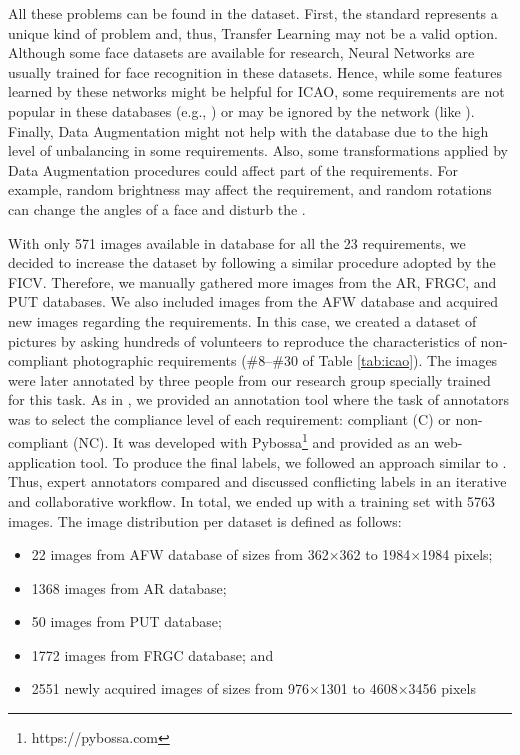 All these problems can be found in the \ficvtest dataset. First, the \icao standard represents a unique kind of problem and, thus, Transfer Learning may not be a valid option. Although some face datasets are available for research, Neural Networks are usually trained for face recognition in these datasets. Hence, while some features learned by these networks might be helpful for ICAO, some requirements are not popular in these databases (e.g., \inkmarked) or may be ignored by the network (like \variedbackground). Finally, Data Augmentation might not help with the \ficvtest database due to the high level of unbalancing in some requirements. Also, some transformations applied by Data Augmentation procedures could affect part of the requirements. For example, random brightness may affect the  \toodarklight requirement, and random rotations can change the angles of a face and disturb the \rollpitchyaw.
 
With only 571 images available in \ficvtest database for all the 23 requirements, we decided to increase the dataset by following a similar procedure adopted by the FICV. Therefore, we manually gathered more images from the AR, FRGC, and PUT databases. We also included images from the AFW database \citep{databaseAFW} and acquired new images regarding the \icao requirements. In this case, we created a dataset of pictures by asking hundreds of volunteers to reproduce the characteristics of non-compliant photographic requirements (\#8--\#30 of Table \ref{tab:icao}). The images were later annotated by three people from our research group specially trained for this task. As in \citep{Nowak2010}, we provided an annotation tool where the task of annotators was to select the compliance level of each requirement: compliant (C) or non-compliant (NC). It was developed with Pybossa\footnote{https://pybossa.com} and provided as an web-application tool. To produce the final labels, we followed an approach similar to \citep{Chang2017}. Thus, expert annotators compared and discussed conflicting labels in an iterative and collaborative workflow. In total, we ended up with a training set with 5763 images. The image distribution per dataset is defined as follows:

\begin{itemize}
\item 22 images from AFW database of sizes from 362$\times$362 to 1984$\times$1984 pixels;
\item 1368 images from AR database;
\item 50 images from PUT database;
\item 1772 images from FRGC database; and
\item 2551 newly acquired images of sizes from 976$\times$1301 to 4608$\times$3456 pixels
\end{itemize}

